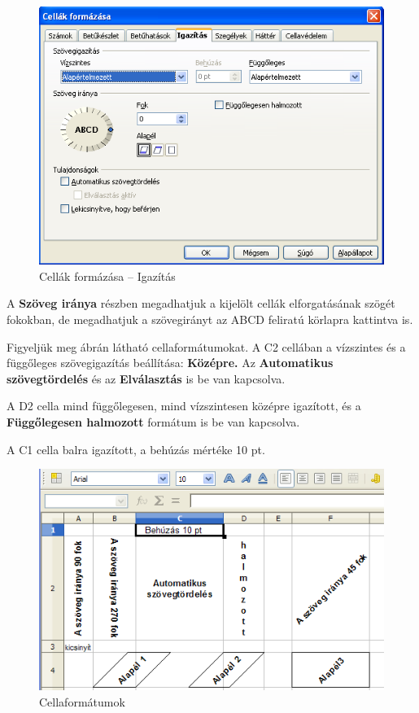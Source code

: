 \begin{figure}[!h]
\begin{center}
\includegraphics[width=12.97cm]{oocalcv2-img12.png}
\caption{Cellák formázása --  Igazítás}\label{CellákIgazítása}
\end{center}
\end{figure}

A \textbf{Szöveg iránya} részben megadhatjuk a kijelölt cellák
elforgatásának szögét fokokban, de megadhatjuk a
szövegirányt az ABCD feliratú körlapra kattintva is.

Figyeljük meg  ábrán látható cellaformátumokat.
A C2 cellában a vízszintes és a függőleges szövegigazítás
beállítása: \textbf{Középre.} Az \textbf{Automatikus
szövegtördelés} és az \textbf{Elválasztás} is be van
kapcsolva.

A D2 cella mind függőlegesen, mind vízszintesen középre
igazított, és a \textbf{Függőlegesen halmozott} formátum is
be van kapcsolva. 

A C1 cella balra igazított, a behúzás mértéke 10 pt.

\begin{figure}[!h]
\begin{center}
\includegraphics[width=12.439cm]{oocalcv2-img13.png}
\caption{Cellaformátumok}\label{Cellaformátumok}
\end{center}
\end{figure}

